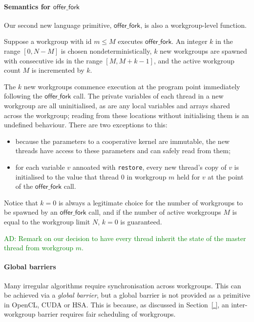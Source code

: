 \documentclass[nocopyrightspace]{sigplanconf-pldi16}
\newcommand{\ADComment}[1]{\textcolor{green}{AD: #1}}
\newcommand{\restore}{\texttt{restore}}
\newcommand{\offerfork}{\mathsf{offer\_fork}}
\begin{document}
\paragraph{Semantics for $\offerfork$}

Our second new language primitive, $\offerfork$, is also a workgroup-level
function.

Suppose a workgroup with id $m\leq M$ executes $\offerfork$.  An
integer $k$ in the range $[0, N-M]$ is chosen nondeterministically,
$k$ new workgroups are spawned with consecutive ids in the range
$[M, M+k-1]$, and the active workgroup count $M$ is incremented by
$k$.

The $k$ new workgroups commence execution at the program point
immediately following the $\offerfork$ call.  The private variables of
each thread in a new workgroup are all uninitialised, as are any local
variables and arrays shared across the workgroup; reading from these
locations without initialising them is an undefined behaviour.  There
are two exceptions to this:

\begin{itemize}

\item because the parameters to a cooperative kernel are immutable,
  the new threads have access to these parameters and can safely read
  from them;

\item for each variable $v$ annoated with \restore, every new
  thread's copy of $v$ is initialised to the value that thread 0 in
  workgroup $m$ held for $v$ at the point of the $\offerfork$ call.

\end{itemize}

Notice that $k=0$ is always a legitimate choice for the number of
workgroups to be spawned by an $\offerfork$ call, and if the number of
active workgroups $M$ is equal to the workgroup limit $N$, $k=0$ is
guaranteed.

\ADComment{Remark on our decision to have every thread inherit the
  state of the master thread from workgroup $m$.}

\paragraph{Global barriers}

Many irregular algorithms require synchronisation across workgroups.
This can be achieved via a \emph{global barrier}, but a global barrier
is not provided as a primitive in OpenCL, CUDA or HSA.  This is
because, as discussed in Section~\ref{ }, an inter-workgroup barrier
requires fair scheduling of workgroups.
\end{document}
